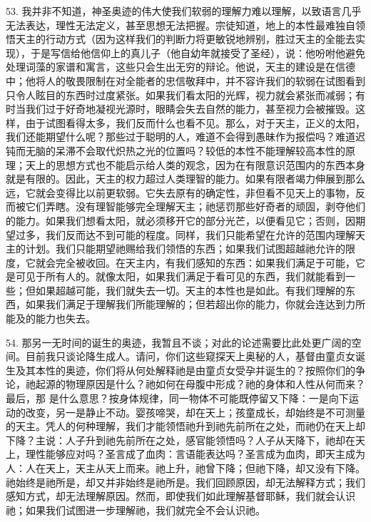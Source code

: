 53. 我并非不知道，神圣奥迹的伟大使我们软弱的理解力难以理解，以致语言几乎无法表达，理性无法定义，甚至思想无法把握。宗徒知道，地上的本性最难独自领悟天主的行动方式（因为这样我们的判断力将更敏锐地辨别，胜过天主的全能去实现），于是写信给他信仰上的真儿子（他自幼年就接受了圣经），说：他吩咐他避免处理词藻的家谱和寓言，这些只会生出无穷的辩论。他说，天主的建设是在信德中；他将人的敬畏限制在对全能者的忠信敬拜中，并不容许我们的软弱在试图看到只令人眩目的东西时过度紧张。如果我们看太阳的光辉，视力就会紧张而减弱；有时当我们过于好奇地凝视光源时，眼睛会失去自然的能力，甚至视力会被摧毁。这样，由于试图看得太多，我们反而什么也看不见。那么，对于天主，正义的太阳，我们还能期望什么呢？那些过于聪明的人，难道不会得到愚昧作为报偿吗？难道迟钝而无脑的呆滞不会取代炽热之光的位置吗？较低的本性不能理解较高本性的原理；天上的思想方式也不能启示给人类的观念，因为在有限意识范围内的东西本身就是有限的。因此，天主的权力超过人类理智的能力。如果有限者竭力伸展到那么远，它就会变得比以前更软弱。它失去原有的确定性，非但看不见天上的事物，反而被它们弄瞎。没有理智能够完全理解天主；祂惩罚那些好奇者的顽固，剥夺他们的能力。如果我们想看太阳，就必须移开它的部分光芒，以便看见它；否则，因期望过多，我们反而达不到可能的程度。同样，我们只能希望在允许的范围内理解天主的计划。我们只能期望祂赐给我们领悟的东西；如果我们试图超越祂允许的限度，它就会完全被收回。在天主内，有我们感知的东西：如果我们满足于可能，它是可见于所有人的。就像太阳，如果我们满足于看可见的东西，我们就能看到一些；但如果超越可能，我们就失去一切。天主的本性也是如此。有我们理解的东西，如果我们满足于理解我们所能理解的；但若超出你的能力，你就会连达到力所能及的能力也失去。\par

54. 那另一无时间的诞生的奥迹，我暂且不谈；对此的论述需要比此处更广阔的空间。目前我只谈论降生成人。请问，你们这些窥探天上奥秘的人，基督由童贞女诞生及其本性的奥迹，你们将从何处解释祂是由童贞女受孕并诞生的？按照你们的争论，祂起源的物理原因是什么？祂如何在母腹中形成？祂的身体和人性从何而来？最后，那 是什么意思？按身体规律，同一物体不可能既停留又下降：一是向下运动的改变，另一是静止不动。婴孩啼哭，却在天上；孩童成长，却始终是不可测量的天主。凭人的何种理解，我们才能领悟祂升到祂先前所在之处，而祂仍在天上却下降？主说：人子升到祂先前所在之处，感官能领悟吗？人子从天降下，祂却在天上，理性能够应对吗？圣言成了血肉：言语能表达吗？圣言成为血肉，即天主成为人：人在天上，天主从天上而来。祂上升，祂曾下降；但祂下降，却又没有下降。祂始终是祂所是，却又并非始终是祂所是。我们回顾原因，却无法解释方式；我们感知方式，却无法理解原因。然而，即使我们如此理解基督耶稣，我们就会认识祂；如果我们试图进一步理解祂，我们就完全不会认识祂。\par

